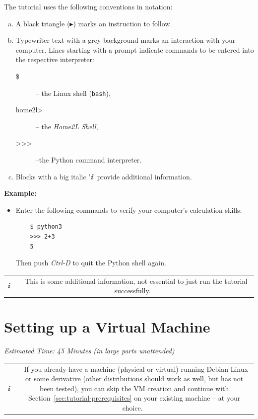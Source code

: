 \documentclass[12pt,english,parskip=half]{scrreprt}
\newcommand{\lst}[1]{\colorbox{lstbackground}{\ttfamily\footnotesize#1}}
\newcommand{\infobox}[1]{
  \hfill
  \setlength\arrayrulewidth{1pt}
  \begin{tabular}[t]{c|c|}
    \parbox{1.8em}{\hfill\textit{\Huge\textbf{i}\,}}
    &
    \,\parbox{0.89\linewidth}{\setlength{\parskip}{0.5em}#1}\,
  \end{tabular}
  \par
}
\begin{document}
The tutorial uses the following conventions in notation:

\begin{enumerate}[a)]
  \item A black triangle ($\blacktriangleright$) marks an instruction to follow.
  \item \lst{Typewriter text with a grey background} marks an interaction with your computer.
    Lines starting with a prompt indicate commands to be entered into the respective
    interpreter:
    \begin{description}
      \item[\lst{\$}] -- the Linux shell (\texttt{bash}),
      \item[\lst{home2l\textgreater}] -- the \emph{Home2L Shell},
      \item[\lst{\textgreater\textgreater\textgreater}] --the Python command interpreter.
    \end{description}
  \item Blocks with a big italic '\textbf{\textit{i}}' provide additional information.
\end{enumerate}

\textbf{Example:}

\begin{itemize}[$\blacktriangleright$]
  \item Enter the following commands to verify your computer's calculation skills:
    \begin{lstlisting}
    $ python3
    >>> 2+3
    5
    \end{lstlisting}
    Then push \emph{Ctrl-D} to quit the Python shell again.
\end{itemize}

\infobox{
  This is some additional information, not essential to just run the tutorial successfully.
}





\section{Setting up a Virtual Machine}
\label{sec:tutorial-vm}


\emph{Estimated Time: 45 Minutes (in large parts unattended)}


\infobox{
  If you already have a machine (physical or virtual) running Debian Linux
  or some derivative (other distributions should work as well, but has not been tested),
  you can skip the VM creation and continue with Section~\ref{sec:tutorial-prerequisites}
  on your existing machine -- at your choice.
}
\end{document}

